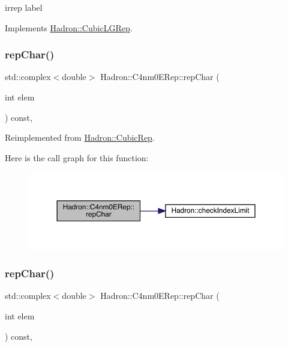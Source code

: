 irrep label 

Implements \mbox{\hyperlink{structHadron_1_1CubicLGRep_a50f5ddbb8f4be4cee0106fa9e8c75e6c}{Hadron\+::\+Cubic\+L\+G\+Rep}}.

\mbox{\label{structHadron_1_1C4nm0ERep_ae2587ec63f886eaafedfaede40ebdba5}} 
\subsubsection{\texorpdfstring{repChar()}{repChar()}\hspace{0.1cm}{\footnotesize\ttfamily [1/3]}}
{\footnotesize\ttfamily std\+::complex$<$double$>$ Hadron\+::\+C4nm0\+E\+Rep\+::rep\+Char (\begin{DoxyParamCaption}\item[{int}]{elem }\end{DoxyParamCaption}) const\hspace{0.3cm}{\ttfamily [inline]}, {\ttfamily [virtual]}}



Reimplemented from \mbox{\hyperlink{structHadron_1_1CubicRep_af45227106e8e715e84b0af69cd3b36f8}{Hadron\+::\+Cubic\+Rep}}.

Here is the call graph for this function\+:
\nopagebreak
\begin{figure}[H]
\begin{center}
\leavevmode
\includegraphics[width=350pt]{d3/d8a/structHadron_1_1C4nm0ERep_ae2587ec63f886eaafedfaede40ebdba5_cgraph}
\end{center}
\end{figure}
\mbox{\label{structHadron_1_1C4nm0ERep_ae2587ec63f886eaafedfaede40ebdba5}} 
\subsubsection{\texorpdfstring{repChar()}{repChar()}\hspace{0.1cm}{\footnotesize\ttfamily [2/3]}}
{\footnotesize\ttfamily std\+::complex$<$double$>$ Hadron\+::\+C4nm0\+E\+Rep\+::rep\+Char (\begin{DoxyParamCaption}\item[{int}]{elem }\end{DoxyParamCaption}) const\hspace{0.3cm}{\ttfamily [inline]}, {\ttfamily [virtual]}}



